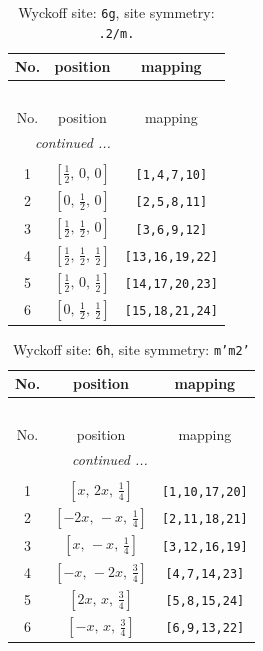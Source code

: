 \documentclass[fleqn,8pt]{jsarticle}
\begin{document}
\renewcommand{\arraystretch}{1.2}
\begin{longtable}{ccc}
\caption{Wyckoff site: {\tt 6g}, site symmetry: {\tt .2/m.}}
 \\
 \hline \hline
No. & position & mapping \\ \hline \endfirsthead

\multicolumn{2}{l}{\tablename\ \thetable{}} \\
 \hline \hline
No. & position & mapping \\ \hline \endhead

 \hline \hline
\multicolumn{2}{r}{\footnotesize\it continued ...} \\ \endfoot

 \hline \hline
\multicolumn{2}{r}{} \\ \endlastfoot

1 & $\left[ \frac{1}{2},\, 0,\, 0 \right]$ & {\tt [1,4,7,10]} \\ \hline
2 & $\left[ 0,\, \frac{1}{2},\, 0 \right]$ & {\tt [2,5,8,11]} \\ \hline
3 & $\left[ \frac{1}{2},\, \frac{1}{2},\, 0 \right]$ & {\tt [3,6,9,12]} \\ \hline
4 & $\left[ \frac{1}{2},\, \frac{1}{2},\, \frac{1}{2} \right]$ & {\tt [13,16,19,22]} \\ \hline
5 & $\left[ \frac{1}{2},\, 0,\, \frac{1}{2} \right]$ & {\tt [14,17,20,23]} \\ \hline
6 & $\left[ 0,\, \frac{1}{2},\, \frac{1}{2} \right]$ & {\tt [15,18,21,24]} \\
\end{longtable}
\renewcommand{\arraystretch}{1.2}
\begin{longtable}{ccc}
\caption{Wyckoff site: {\tt 6h}, site symmetry: {\tt m'm2'}}
 \\
 \hline \hline
No. & position & mapping \\ \hline \endfirsthead

\multicolumn{2}{l}{\tablename\ \thetable{}} \\
 \hline \hline
No. & position & mapping \\ \hline \endhead

 \hline \hline
\multicolumn{2}{r}{\footnotesize\it continued ...} \\ \endfoot

 \hline \hline
\multicolumn{2}{r}{} \\ \endlastfoot

1 & $\left[ x,\, 2 x,\, \frac{1}{4} \right]$ & {\tt [1,10,17,20]} \\ \hline
2 & $\left[ - 2 x,\, - x,\, \frac{1}{4} \right]$ & {\tt [2,11,18,21]} \\ \hline
3 & $\left[ x,\, - x,\, \frac{1}{4} \right]$ & {\tt [3,12,16,19]} \\ \hline
4 & $\left[ - x,\, - 2 x,\, \frac{3}{4} \right]$ & {\tt [4,7,14,23]} \\ \hline
5 & $\left[ 2 x,\, x,\, \frac{3}{4} \right]$ & {\tt [5,8,15,24]} \\ \hline
6 & $\left[ - x,\, x,\, \frac{3}{4} \right]$ & {\tt [6,9,13,22]} \\
\end{longtable}
\end{document}
